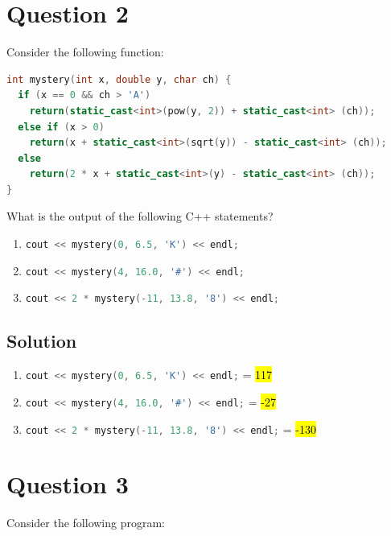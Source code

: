 \documentclass[a4paper, 10pt]{article}
\begin{document}
  \section{Question 2}
    Consider the following function:

    \begin{lstlisting}[language=c++]
int mystery(int x, double y, char ch) {
  if (x == 0 && ch > 'A') 
    return(static_cast<int>(pow(y, 2)) + static_cast<int> (ch)); 
  else if (x > 0)
    return(x + static_cast<int>(sqrt(y)) - static_cast<int> (ch)); 
  else
    return(2 * x + static_cast<int>(y) - static_cast<int> (ch));
}
    \end{lstlisting}

    What is the output of the following C++ statements?
      \begin{enumerate}[label=\Alph*.]
        \item \lstinline[columns=fixed,language=c++]%
          {cout << mystery(0, 6.5, 'K') << endl;}
        \item \lstinline[columns=fixed,language=c++]%
          {cout << mystery(4, 16.0, '#') << endl;}
        \item \lstinline[columns=fixed,language=c++]%
          {cout << 2 * mystery(-11, 13.8, '8') << endl;}
      \end{enumerate}
    % Question 2 Solution
    \subsection{Solution}
      \begin{enumerate}[label=\alph*.]
        \item \lstinline[columns=fixed,language=c++]%
          {cout << mystery(0, 6.5, 'K') << endl;} = \hl{117}
        \item \lstinline[columns=fixed,language=c++]%
          {cout << mystery(4, 16.0, '#') << endl;} = \hl{-27}
        \item \lstinline[columns=fixed,language=c++]%
          {cout << 2 * mystery(-11, 13.8, '8') << endl;} = \hl{-130}
      \end{enumerate}

  % Question 3
  \section{Question 3}
    Consider the following program:
\end{document}
